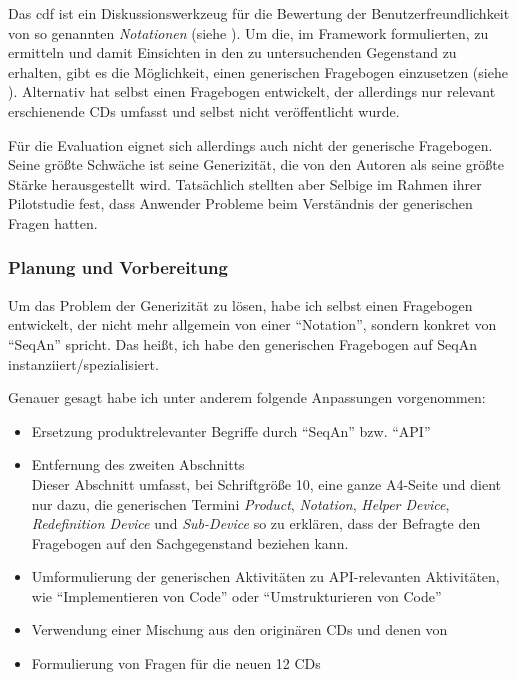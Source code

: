Das \gls{cdf} ist ein Diskussionswerkzeug für die Bewertung der Benutzerfreundlichkeit von so genannten \textit{Notationen} (siehe ). Um die, im Framework formulierten,  zu ermitteln und damit Einsichten in den zu untersuchenden Gegenstand zu erhalten, gibt es die Möglichkeit, einen generischen Fragebogen \citep{161956} einzusetzen (siehe ). Alternativ hat \cite{Kadoda:2000vj} selbst einen Fragebogen entwickelt, der allerdings nur relevant erschienende CDs umfasst und selbst nicht veröffentlicht wurde.

Für die Evaluation eignet sich allerdings auch nicht der generische Fragebogen. Seine größte Schwäche ist seine Generizität, die von den Autoren als seine größte Stärke herausgestellt wird. Tatsächlich stellten aber Selbige im Rahmen ihrer Pilotstudie fest, dass Anwender Probleme beim Verständnis der generischen Fragen hatten.


\subsubsection{Planung und Vorbereitung}

Um das Problem der Generizität zu lösen, habe ich selbst einen Fragebogen entwickelt, der nicht mehr allgemein von einer ``Notation'', sondern konkret von ``SeqAn'' spricht. Das heißt, ich habe den generischen Fragebogen auf SeqAn instanziiert/spezialisiert.

Genauer gesagt habe ich unter anderem folgende Anpassungen vorgenommen:
\begin{itemize}
  \item Ersetzung produktrelevanter Begriffe durch ``SeqAn'' bzw. ``API''
  \item Entfernung des zweiten Abschnitts\\Dieser Abschnitt umfasst, bei Schriftgröße 10, eine ganze A4-Seite und dient nur dazu, die generischen Termini \textit{Product}, \textit{Notation}, \textit{Helper Device}, \textit{Redefinition Device} und \textit{Sub-Device} so zu erklären, dass der Befragte den Fragebogen auf den Sachgegenstand beziehen kann.
  \item Umformulierung der generischen Aktivitäten zu API-relevanten Aktivitäten, wie ``Implementieren von Code'' oder ``Umstrukturieren von Code''
  \item Verwendung einer Mischung aus den originären CDs und denen von \cite{Anonymous:9HSMlhmF}
  \item Formulierung von Fragen für die neuen 12 CDs
\end{itemize}

